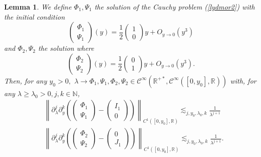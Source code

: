 \documentclass[11 pt]{amsart}
\newtheorem{lem}{Lemma}[section]
\theoremstyle{definition}
\theoremstyle{remark}
\numberwithin{equation}{section}
\begin{document}
\begin{lem}
  \label{sicuro}We define $\Phi_1, \Psi_1$ the solution of the Cauchy problem
  (\ref{lydmor2}) with the initial condition
  \[ \left(\begin{array}{c}
       \Phi_1\\
       \Psi_1
     \end{array}\right) (y) = \frac{1}{2}\left(\begin{array}{c}
       1\\
       0
     \end{array}\right) y + O_{y \rightarrow 0} (y^3) \]
  and $\Phi_2, \Psi_2$ the solution where
  \[ \left(\begin{array}{c}
       \Phi_2\\
       \Psi_2
     \end{array}\right) (y) =  \frac{1}{2}\left(\begin{array}{c}
       0\\
       1
     \end{array}\right) y + O_{y \rightarrow 0} (y^3) . \]
  Then, for any $y_0 > 0,$ $\lambda \rightarrow \Phi_1, \Psi_1, \Phi_2, \Psi_2
  \in \mathcal{C}^\infty (\mathbb{R}^{+ \ast}, \mathcal{C}^\infty ([0, y_0], \mathbb{R}))$
  with, for any $\lambda \geqslant \lambda_0>0, j,k \in \mathbb{N}$,
\begin{align*}
& \left\| \partial_{\lambda}^j \partial_y^k \left( \left(\begin{array}{c}
       \Phi_1\\
       \Psi_1
     \end{array}\right) - \left(\begin{array}{c}
       I_1\\
       0
     \end{array}\right) \right) \right\|_{C^1 ([0, y_0], \mathbb{R})}
     \lesssim_{j, y_0,\lambda_0,k} \frac{1}{\lambda^{j + 1}} \\
& \left\| \partial_{\lambda}^j \partial_y^k \left( \left(\begin{array}{c}
       \Phi_2\\
       \Psi_2
     \end{array}\right) - \left(\begin{array}{c}
       0\\
       J_1
     \end{array}\right) \right) \right\|_{C^1 ([0, y_0], \mathbb{R})}
     \lesssim_{j, y_0,\lambda_0,k} \frac{1}{\lambda^{j + 1}}.
\end{align*} 
\end{lem}
\end{document}
